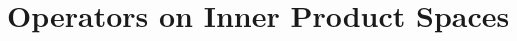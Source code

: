 \documentclass[class=linear-algebra,crop=false]{standalone}
\begin{document}
\chapter{Operators on Inner Product Spaces}
\end{document}
